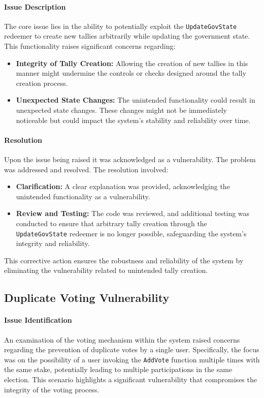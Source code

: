 \documentclass[11pt]{article}
\begin{document}
\paragraph{Issue Description}
The core issue lies in the ability to potentially exploit the \texttt{UpdateGovState} redeemer to create new tallies arbitrarily while updating the government state.
This functionality raises significant concerns regarding:
\begin{itemize}
    \item \textbf{Integrity of Tally Creation:} Allowing the creation of new tallies in this manner might undermine the controls or checks designed around the tally creation process.
    \item \textbf{Unexpected State Changes:} The unintended functionality could result in unexpected state changes. These changes might not be immediately noticeable but could impact the system's stability and reliability over time.
\end{itemize}

\paragraph{Resolution}
Upon the issue being raised it was acknowledged as a vulnerability.
The problem was addressed and resolved. The resolution involved:
\begin{itemize}
    \item \textbf{Clarification:} A clear explanation was provided, acknowledging the unintended functionality as a vulnerability.
    \item \textbf{Review and Testing:} The code was reviewed, and additional testing was conducted to ensure that arbitrary tally creation through the \texttt{UpdateGovState} redeemer is no longer possible, safeguarding the system's integrity and reliability.
\end{itemize}
This corrective action ensures the robustness and reliability of the system by eliminating the vulnerability related to unintended tally creation.

\subsection{Duplicate Voting Vulnerability}

\paragraph{Issue Identification}
An examination of the voting mechanism within the system raised concerns regarding the prevention of duplicate votes by a single user.
Specifically, the focus was on the possibility of a user invoking the \texttt{AddVote} function multiple times with the same stake, potentially leading to multiple participations in the same election.
This scenario highlights a significant vulnerability that compromises the integrity of the voting process.
\end{document}

